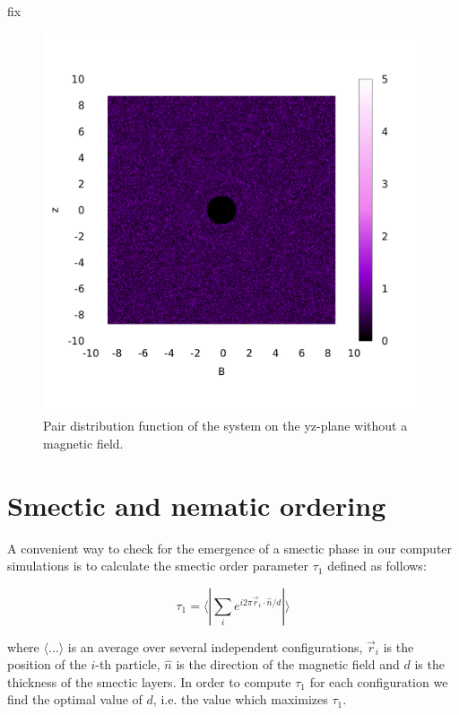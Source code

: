 \documentclass{article}
\begin{document}
fix
\begin{figure}
    \centering
    \includegraphics[width=1\columnwidth]{gyz_noB.png}
    \caption{Pair distribution function of the system on the yz-plane without a magnetic field.}
    \label{fig:gyz_noB}
\end{figure}

\newpage

\section{Smectic and nematic ordering}

A convenient way to check for the emergence of a smectic phase in our computer simulations 
is to calculate the smectic order parameter $\tau_1$ defined as follows:

\begin{equation}
    \tau_1 = \langle | \sum_i e^{i 2\pi \vec{r}_i \cdot \hat{n} / d } |\rangle 
\end{equation}

where $\langle\ldots\rangle$ is an average over several independent configurations, $\vec{r}_i$ is the position of the $i$-th particle, $\hat{n}$ is the direction of the magnetic
field and $d$ is the thickness of the smectic layers.
In order to compute $\tau_1$ for each configuration we find the optimal value of $d$, i.e. 
the value which maximizes $\tau_1$.
\end{document}

